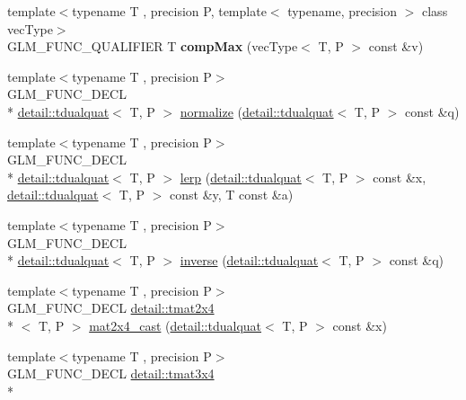 \begin{DoxyCompactItemize}
\item 
\hypertarget{namespaceglm_a6d3b715875f887b364a34a7529c8fc1b}{{\footnotesize template$<$typename T , precision P, template$<$ typename, precision $>$ class vec\-Type$>$ }\\G\-L\-M\-\_\-\-F\-U\-N\-C\-\_\-\-Q\-U\-A\-L\-I\-F\-I\-E\-R T {\bfseries comp\-Max} (vec\-Type$<$ T, P $>$ const \&v)}\label{namespaceglm_a6d3b715875f887b364a34a7529c8fc1b}

\item 
{\footnotesize template$<$typename T , precision P$>$ }\\G\-L\-M\-\_\-\-F\-U\-N\-C\-\_\-\-D\-E\-C\-L \\*
\hyperlink{structglm_1_1detail_1_1tdualquat}{detail\-::tdualquat}$<$ T, P $>$ \hyperlink{group__gtc__dual__quaternion_ga4364d115fe8ee2f65ff047726133d0ad}{normalize} (\hyperlink{structglm_1_1detail_1_1tdualquat}{detail\-::tdualquat}$<$ T, P $>$ const \&q)
\item 
{\footnotesize template$<$typename T , precision P$>$ }\\G\-L\-M\-\_\-\-F\-U\-N\-C\-\_\-\-D\-E\-C\-L \\*
\hyperlink{structglm_1_1detail_1_1tdualquat}{detail\-::tdualquat}$<$ T, P $>$ \hyperlink{group__gtc__dual__quaternion_ga28cbcf029272d5351d4695b8610de126}{lerp} (\hyperlink{structglm_1_1detail_1_1tdualquat}{detail\-::tdualquat}$<$ T, P $>$ const \&x, \hyperlink{structglm_1_1detail_1_1tdualquat}{detail\-::tdualquat}$<$ T, P $>$ const \&y, T const \&a)
\item 
{\footnotesize template$<$typename T , precision P$>$ }\\G\-L\-M\-\_\-\-F\-U\-N\-C\-\_\-\-D\-E\-C\-L \\*
\hyperlink{structglm_1_1detail_1_1tdualquat}{detail\-::tdualquat}$<$ T, P $>$ \hyperlink{group__gtc__dual__quaternion_gaad6b9faeb1134c04defae01426a777f8}{inverse} (\hyperlink{structglm_1_1detail_1_1tdualquat}{detail\-::tdualquat}$<$ T, P $>$ const \&q)
\item 
{\footnotesize template$<$typename T , precision P$>$ }\\G\-L\-M\-\_\-\-F\-U\-N\-C\-\_\-\-D\-E\-C\-L \hyperlink{structglm_1_1detail_1_1tmat2x4}{detail\-::tmat2x4}\\*
$<$ T, P $>$ \hyperlink{group__gtc__dual__quaternion_gade155fb0dfc144259a25897776e73325}{mat2x4\-\_\-cast} (\hyperlink{structglm_1_1detail_1_1tdualquat}{detail\-::tdualquat}$<$ T, P $>$ const \&x)
\item 
{\footnotesize template$<$typename T , precision P$>$ }\\G\-L\-M\-\_\-\-F\-U\-N\-C\-\_\-\-D\-E\-C\-L \hyperlink{structglm_1_1detail_1_1tmat3x4}{detail\-::tmat3x4}\\*

\end{DoxyCompactItemize}
